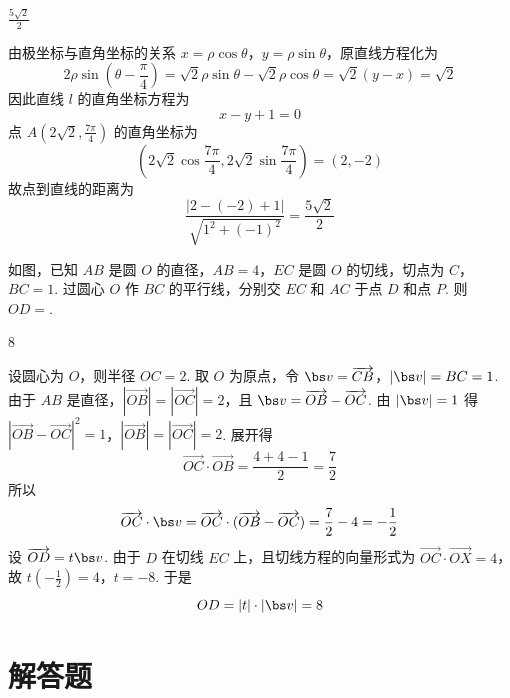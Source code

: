 \begin{answer}
\(\frac{5\sqrt{2}}{2}\)
\end{answer}

\begin{solution}
由极坐标与直角坐标的关系 \(x=\rho\cos\theta\)，\(y=\rho\sin\theta\)，原直线方程化为
\[
2\rho\sin\left(\theta-\frac\pi4\right)
=\sqrt2\rho\sin\theta-\sqrt2\rho\cos\theta
=\sqrt2(y-x)=\sqrt2
\]
因此直线 \(l\) 的直角坐标方程为
\[
x-y+1=0
\]
点 \(A\left(2\sqrt2,\frac{7\pi}{4}\right)\) 的直角坐标为
\[
\left(2\sqrt2\cos\frac{7\pi}{4},2\sqrt2\sin\frac{7\pi}{4}\right)=(2,-2)
\]
故点到直线的距离为
\[
\frac{|2-(-2)+1|}{\sqrt{1^2+(-1)^2}}
=\frac{5\sqrt2}{2}
\]
\end{solution}

\begin{problem}
如图，已知 \(AB\) 是圆 \(O\) 的直径，\(AB = 4\)，\(EC\) 是圆 \(O\) 的切线，切点为 \(C\)，\(BC = 1\). 过圆心 \(O\) 作 \(BC\) 的平行线，分别交 \(EC\) 和 \(AC\) 于点 \(D\) 和点 \(P\).
则 \(OD =\)\fillinblank{}.

\begin{center}
\end{center}
\end{problem}

\begin{answer}
8
\end{answer}

\begin{solution}
设圆心为 \(O\)，则半径 \(OC=2\). 取 \(O\) 为原点，令
\(\bs v=\overrightarrow{CB}\)，\(|\bs v|=BC=1\).
由于 \(AB\) 是直径，\(|\overrightarrow{OB}|=|\overrightarrow{OC}|=2\)，且
\(\bs v=\overrightarrow{OB}-\overrightarrow{OC}\). 由 \(|\bs v|=1\) 得
\(|\overrightarrow{OB}-\overrightarrow{OC}|^2=1\)，\(|\overrightarrow{OB}|=|\overrightarrow{OC}|=2\).
展开得
\[
\overrightarrow{OC}\cdot\overrightarrow{OB}=\frac{4+4-1}{2}=\frac72
\]
所以
\[
\overrightarrow{OC}\cdot\bs v
=\overrightarrow{OC}\cdot(\overrightarrow{OB}-\overrightarrow{OC})
=\frac72-4=-\frac12
\]
设 \(\overrightarrow{OD}=t\bs v\). 由于 \(D\) 在切线 \(EC\) 上，且切线方程的向量形式为 \(\overrightarrow{OC}\cdot\overrightarrow{OX}=4\)，故
\(t\left(-\frac12\right)=4\)，\(t=-8\).
于是
\[
OD=|t|\cdot|\bs v|=8
\]
\end{solution}

\section{解答题}


